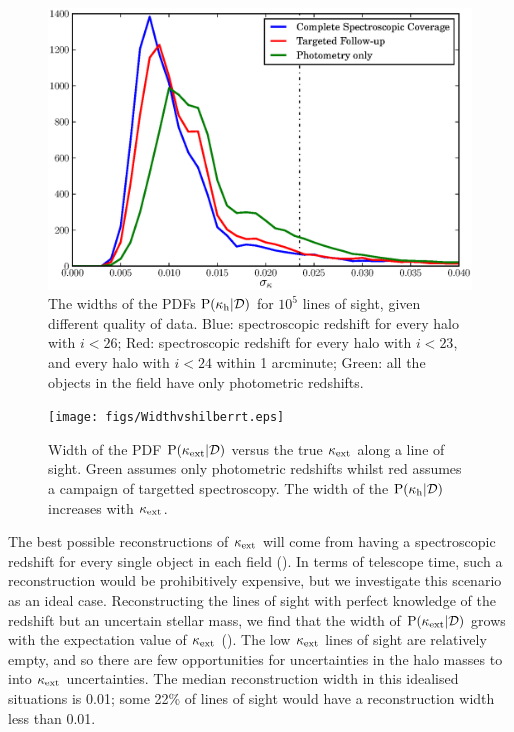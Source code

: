 \documentclass[useAMS,usenatbib]{mn2e}
\begin{document}
\begin{figure}
\includegraphics[width=\columnwidth]{figs/Width.eps}
\caption{The widths of the \infered PDFs ${\rm P}(\kappa_{\rm h}|{\mathcal{D}})$ for
$10^5$ lines of sight, given different quality of data. Blue:
spectroscopic redshift for every halo with $i<26$; Red: 
spectroscopic redshift for every halo with $i<23$, and every halo with $i<24$
within 1 arcminute;
Green: all the objects in the field have only photometric redshifts.}
\label{fig:reconwidths}
\end{figure}

\begin{figure}
\texttt{[image: figs/Widthvshilberrt.eps]}
\caption{Width of the \infered PDF ${\rm P}(\kappa_{\rm ext}|{\mathcal{D}})$ versus the true
$\kappa_{\rm ext}$ along a line of sight. Green assumes only photometric redshifts
whilst red assumes a campaign of targetted spectroscopy. The width of the
\infered ${\rm P}(\kappa_{\rm h}|{\mathcal{D}})$ increases with $\kappa_{\rm ext}$.}

\label{fig:widthsvsH}
\end{figure}

The best possible reconstructions of $\kappa_{\rm ext}$ will come from having a
spectroscopic redshift for every single object in each field
().  In terms of telescope time, such a reconstruction
would be prohibitively expensive, but we investigate this scenario as an ideal
case. Reconstructing the lines of sight with perfect knowledge of the redshift
but an uncertain stellar mass, we find that the width of ${\rm P}(\kappa_{\rm ext}|{\mathcal{D}})$
grows with the expectation value of $\kappa_{\rm ext}$ (). The low
$\kappa_{\rm ext}$ lines of sight are relatively empty, and so there are few
opportunities for uncertainties in the halo masses to \propogate into $\kappa_{\rm ext}$
uncertainties. The median reconstruction width in this idealised situations is
0.01; some 22\% of lines of sight would have a reconstruction width less
than 0.01. 
\end{document}
